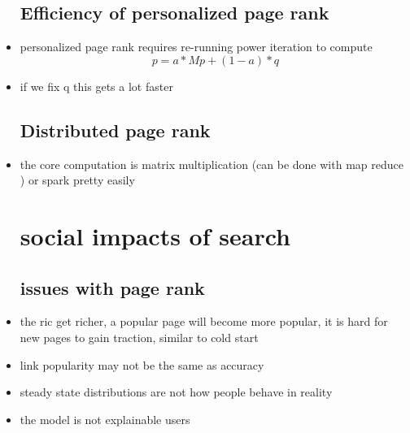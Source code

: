 \documentclass{article}
\begin{document}
\begin{itemize}
\subsection*{Efficiency of personalized page rank }
\item personalized page rank requires re-running power iteration to compute $$p=a*Mp+(1-a)*q$$
\item if we fix q this gets a lot faster 

\subsection*{Distributed page rank}
\item the core computation is matrix multiplication (can be done with map reduce ) or spark pretty easily
\section*{social impacts of search }
\subsection*{issues with page rank}
\item the ric get richer, a popular page will become more popular, it is hard for new pages to gain traction, similar to cold start 
\item link popularity may not be the same as accuracy 
\item steady state distributions are not how people behave in reality
\item the model is not explainable users 



\end{itemize}
\end{document}
